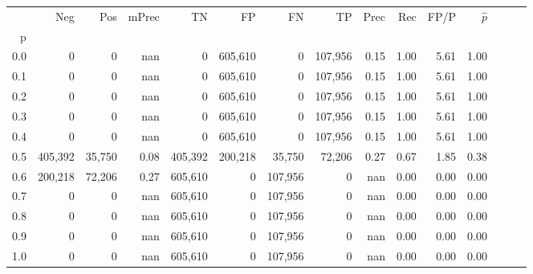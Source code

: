 \begin{tabular}{rrrrrrrrrrrrrrr}
\toprule
{} &      Neg &     Pos & mPrec &       TN &       FP &       FN &       TP &  Prec &   Rec &  FP/P & $\hat{p}$ \\
p   &          &         &       &          &          &          &          &       &       &       &           \\
\midrule
0.0 &        0 &       0 &   nan &        0 &  605,610 &        0 &  107,956 &  0.15 &  1.00 &  5.61 &      1.00 \\
0.1 &        0 &       0 &   nan &        0 &  605,610 &        0 &  107,956 &  0.15 &  1.00 &  5.61 &      1.00 \\
0.2 &        0 &       0 &   nan &        0 &  605,610 &        0 &  107,956 &  0.15 &  1.00 &  5.61 &      1.00 \\
0.3 &        0 &       0 &   nan &        0 &  605,610 &        0 &  107,956 &  0.15 &  1.00 &  5.61 &      1.00 \\
0.4 &        0 &       0 &   nan &        0 &  605,610 &        0 &  107,956 &  0.15 &  1.00 &  5.61 &      1.00 \\
0.5 &  405,392 &  35,750 &  0.08 &  405,392 &  200,218 &   35,750 &   72,206 &  0.27 &  0.67 &  1.85 &      0.38 \\
0.6 &  200,218 &  72,206 &  0.27 &  605,610 &        0 &  107,956 &        0 &   nan &  0.00 &  0.00 &      0.00 \\
0.7 &        0 &       0 &   nan &  605,610 &        0 &  107,956 &        0 &   nan &  0.00 &  0.00 &      0.00 \\
0.8 &        0 &       0 &   nan &  605,610 &        0 &  107,956 &        0 &   nan &  0.00 &  0.00 &      0.00 \\
0.9 &        0 &       0 &   nan &  605,610 &        0 &  107,956 &        0 &   nan &  0.00 &  0.00 &      0.00 \\
1.0 &        0 &       0 &   nan &  605,610 &        0 &  107,956 &        0 &   nan &  0.00 &  0.00 &      0.00 \\
\bottomrule
\end{tabular}
